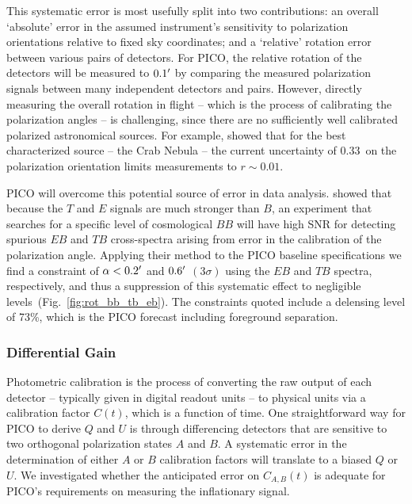 \documentclass[PICOReport.tex]{subfiles}
\begin{document}
This systematic error is most usefully split into two contributions: an overall `absolute' error in the assumed instrument's sensitivity to polarization orientations relative to fixed sky coordinates; and a `relative' rotation error between various pairs of detectors. For PICO, the relative rotation of the detectors will be measured to $0.1'$ by comparing the measured polarization signals between many independent detectors and pairs. However, directly measuring the overall rotation in flight -- which is the process of calibrating the polarization angles --  is challenging, since there are no sufficiently well calibrated polarized astronomical sources. For example, \citet{Aumont+2018} showed that for the best characterized source -- the Crab Nebula -- the current uncertainty of $0.33$\degree\ on the polarization orientation limits measurements to $r \sim 0.01$. 

PICO will overcome this potential source of error 
in data analysis. \citet{yadav2010} showed that because the $T$ and $E$ signals are much stronger than $B$, an experiment that searches for a specific level of cosmological $BB$ will have high \ac{SNR} for detecting spurious $EB$ and $TB$ cross-spectra arising from error in the calibration of the polarization angle. Applying their method to the PICO baseline specifications we find a constraint of $\alpha<0.2'$ and $0.6'$ $(3\sigma)$ using the $EB$ and $TB$ spectra, respectively, and thus a suppression of this systematic effect to negligible levels~(Fig.~\ref{fig:rot_bb_tb_eb}). The constraints quoted include a delensing level of 73\%, which is the PICO forecast including foreground separation. 


\subsubsection{Differential Gain}
\label{sec:gain_stability}

Photometric calibration is the process of converting the raw output of each detector -- typically given in digital readout units -- to physical units via a calibration factor $C(t)$, which is a function of time. One straightforward way for PICO to derive $Q$ and $U$ is through differencing detectors that are sensitive to two orthogonal polarization states $A$ and $B$. A systematic error in the determination of either $A$ or $B$ calibration factors will translate to a biased $Q$ or $U$. We investigated whether the anticipated error on $C_{A,B} (t)$ is adequate for PICO's requirements on measuring the inflationary signal.  
\end{document}
